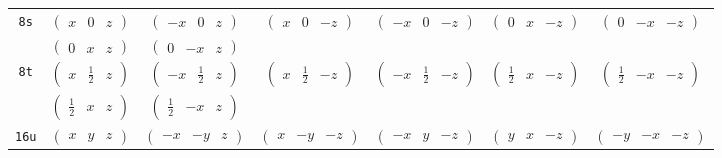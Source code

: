 \documentclass[fleqn,9pt,landscape]{jsarticle}
\begin{document}
\begin{center}
\begin{longtable}{ccccccc}
{\tt 8s} & $ \begin{pmatrix} x & 0 & z \end{pmatrix} $ & $ \begin{pmatrix} - x & 0 & z \end{pmatrix} $ & $ \begin{pmatrix} x & 0 & - z \end{pmatrix} $ & $ \begin{pmatrix} - x & 0 & - z \end{pmatrix} $ & $ \begin{pmatrix} 0 & x & - z \end{pmatrix} $ & $ \begin{pmatrix} 0 & - x & - z \end{pmatrix} $ \\
& $ \begin{pmatrix} 0 & x & z \end{pmatrix} $ & $ \begin{pmatrix} 0 & - x & z \end{pmatrix} $ & $  $ & $  $ & $  $ & $  $ \\ \hline
{\tt 8t} & $ \begin{pmatrix} x & \frac{1}{2} & z \end{pmatrix} $ & $ \begin{pmatrix} - x & \frac{1}{2} & z \end{pmatrix} $ & $ \begin{pmatrix} x & \frac{1}{2} & - z \end{pmatrix} $ & $ \begin{pmatrix} - x & \frac{1}{2} & - z \end{pmatrix} $ & $ \begin{pmatrix} \frac{1}{2} & x & - z \end{pmatrix} $ & $ \begin{pmatrix} \frac{1}{2} & - x & - z \end{pmatrix} $ \\
& $ \begin{pmatrix} \frac{1}{2} & x & z \end{pmatrix} $ & $ \begin{pmatrix} \frac{1}{2} & - x & z \end{pmatrix} $ & $  $ & $  $ & $  $ & $  $ \\ \hline
{\tt 16u} & $ \begin{pmatrix} x & y & z \end{pmatrix} $ & $ \begin{pmatrix} - x & - y & z \end{pmatrix} $ & $ \begin{pmatrix} x & - y & - z \end{pmatrix} $ & $ \begin{pmatrix} - x & y & - z \end{pmatrix} $ & $ \begin{pmatrix} y & x & - z \end{pmatrix} $ & $ \begin{pmatrix} - y & - x & - z \end{pmatrix} $ \\

\end{longtable}
\end{center}
\end{document}
